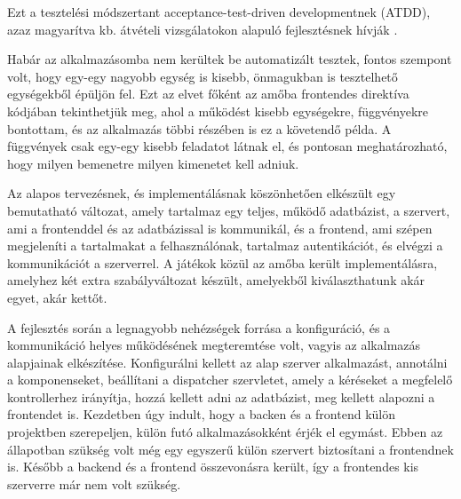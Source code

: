 Ezt a tesztelési módszertant acceptance-test-driven developmentnek (ATDD), azaz magyarítva kb. átvételi vizsgálatokon alapuló fejlesztésnek hívják \cite{atdd}.


Habár az alkalmazásomba nem kerültek be automatizált tesztek, fontos szempont volt, hogy egy-egy nagyobb egység is kisebb, önmagukban is tesztelhető egységekből épüljön fel. Ezt az elvet főként az amőba frontendes direktíva kódjában tekinthetjük meg, ahol a működést kisebb egységekre, függvényekre bontottam, és az alkalmazás többi részében is ez a követendő példa. A függvények csak egy-egy kisebb feladatot látnak el, és pontosan meghatározható, hogy milyen bemenetre milyen kimenetet kell adniuk.


Az alapos tervezésnek, és implementálásnak köszönhetően elkészült egy bemutatható változat, amely tartalmaz egy teljes, működő adatbázist, a szervert, ami a frontenddel és az adatbázissal is kommunikál, és a frontend, ami szépen megjeleníti a tartalmakat a felhasználónak, tartalmaz autentikációt, és elvégzi a kommunikációt a szerverrel.  A játékok közül az amőba került implementálásra, amelyhez két extra szabályváltozat készült, amelyekből kiválaszthatunk akár egyet, akár kettőt.

A fejlesztés során a legnagyobb nehézségek forrása a konfiguráció, és a kommunikáció helyes működésének megteremtése volt, vagyis az alkalmazás alapjainak elkészítése. Konfigurálni kellett az alap szerver alkalmazást, annotálni a komponenseket, beállítani a dispatcher szervletet, amely a kéréseket a megfelelő kontrollerhez irányítja, hozzá kellett adni az adatbázist, meg kellett alapozni a frontendet is. Kezdetben úgy indult, hogy a backen és a frontend külön projektben szerepeljen, külön futó alkalmazásokként érjék el egymást. Ebben az állapotban szükség volt még egy egyszerű külön szervert biztosítani a frontendnek is. Később a backend és a frontend összevonásra került, így a frontendes kis szerverre már nem volt szükség.

